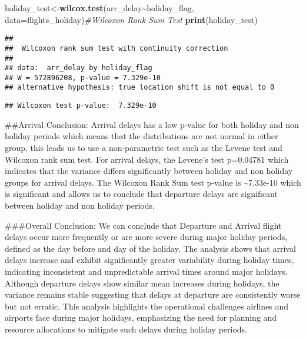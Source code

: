 \documentclass[
]{article}
\newenvironment{Shaded}{\begin{snugshade}}{\end{snugshade}}
\newcommand{\AttributeTok}[1]{\textcolor[rgb]{0.13,0.29,0.53}{#1}}
\newcommand{\CommentTok}[1]{\textcolor[rgb]{0.56,0.35,0.01}{\textit{#1}}}
\newcommand{\DecValTok}[1]{\textcolor[rgb]{0.00,0.00,0.81}{#1}}
\newcommand{\FunctionTok}[1]{\textcolor[rgb]{0.13,0.29,0.53}{\textbf{#1}}}
\newcommand{\NormalTok}[1]{#1}
\newcommand{\OtherTok}[1]{\textcolor[rgb]{0.56,0.35,0.01}{#1}}
\newcommand{\SpecialCharTok}[1]{\textcolor[rgb]{0.81,0.36,0.00}{\textbf{#1}}}
\newcommand{\StringTok}[1]{\textcolor[rgb]{0.31,0.60,0.02}{#1}}
\begin{document}
\begin{Shaded}
\begin{Highlighting}[]
\NormalTok{holiday\_test}\OtherTok{\textless{}{-}}\FunctionTok{wilcox.test}\NormalTok{(arr\_delay}\SpecialCharTok{\textasciitilde{}}\NormalTok{holiday\_flag, }\AttributeTok{data=}\NormalTok{flights\_holiday)}\CommentTok{\#Wilcoxon Rank Sum Test}
\FunctionTok{print}\NormalTok{(holiday\_test)}
\end{Highlighting}
\end{Shaded}

\begin{verbatim}
## 
##  Wilcoxon rank sum test with continuity correction
## 
## data:  arr_delay by holiday_flag
## W = 572896208, p-value = 7.329e-10
## alternative hypothesis: true location shift is not equal to 0
\end{verbatim}

\begin{Shaded}
\end{Shaded}

\begin{verbatim}
## Wilcoxon test p-value:  7.329e-10
\end{verbatim}

\#\#Arrival Conclusion: Arrival delays has a low p-value for both
holiday and non holiday periods which means that the distributions are
not normal in either group, this leads us to use a non-parametric test
such as the Levene test and Wilcoxon rank sum test. For arrival delays,
the Levene's test p=0.04781 which indicates that the variance differs
significantly between holiday and non holiday groups for arrival delays.
The Wilcoxon Rank Sum test p-value is \textasciitilde7.33e-10 which is
significant and allows us to conclude that departure delays are
significant between holiday and non holiday periods.

\#\#\#Overall Conclusion: We can conclude that Departure and Arrival
flight delays occur more frequently or are more severe during major
holiday periods, defined as the day before and day of the holiday. The
analysis shows that arrival delays increase and exhibit significantly
greater variability during holiday times, indicating inconsistent and
unpredictable arrival times around major holidays. Although departure
delays show similar mean increases during holidays, the variance remains
stable suggesting that delays at departure are consistently worse but
not erratic. This analysis highlights the operational challenges
airlines and airports face during major holidays, emphasizing the need
for planning and resource allocations to mitigate such delays during
holiday periods.
\end{document}
